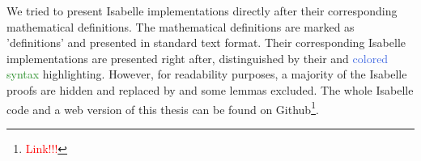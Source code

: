 \begin{isabellebody}
\begin{isamarkuptext}
We tried to present Isabelle implementations directly after their corresponding mathematical definitions.
The mathematical definitions are marked as 'definitions' and presented in standard text format. Their corresponding Isabelle implementations
are presented right after, distinguished by their  and \textcolor{RoyalBlue}{colored} \textcolor{ForestGreen}{syntax} \textcolor{Cerulean}{highlighting}.
However, for readability purposes, a majority of the Isabelle proofs are hidden and replaced by \isa{{\isasymproof}} and some lemmas excluded. The whole Isabelle code and a web version of this thesis can be found on Github\footnote{\textcolor{red}{Link!!!}}.%
\end{isamarkuptext}\isamarkuptrue%
%
\isadelimtheory
%
\endisadelimtheory
%
\isatagtheory
%
\endisatagtheory
{\isafoldtheory}%
%
\isadelimtheory
%
\endisadelimtheory
%
\end{isabellebody}%
\endinput
